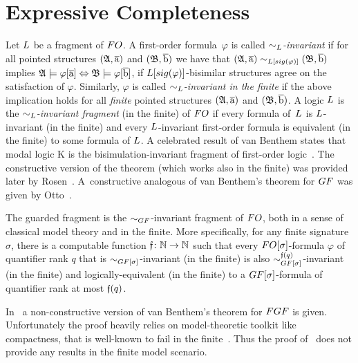 
\section{Expressive Completeness}\label{sec:van-benthem-theorem}


Let $\logicL$ be a fragment of $\FO$. 
A first-order formula~$\varphi$ is called \emph{$\bisimto_{\logicL}$-invariant}
if for all pointed structures $({\mathfrak{A}},\overline{\mathrm{a}})$ and $({\mathfrak{B}}, \overline{\mathrm{b}})$ we have that  
$(\str{A},\elemtuplea) \bisimto_{\logicL[\sig(\varphi)]} (\str{B}, \elemtupleb)$ implies
${\mathfrak{A}} \models \varphi[\overline{\mathrm{a}}] \Leftrightarrow {\mathfrak{B}} \models \varphi[\overline{\mathrm{b}}]$, \ie if $\logicL[\sig(\varphi)]$-bisimilar structures agree on the satisfaction of $\varphi$.
Similarly, $\varphi$ is called \emph{$\bisimto_{\logicL}$-invariant in the finite} if the above implication holds for all \emph{finite} pointed structures $({\mathfrak{A}},\overline{\mathrm{a}})$ and $({\mathfrak{B}}, \overline{\mathrm{b}})$.
A logic $\logicL$ is the \emph{$\bisimto_{\logicL}$-invariant fragment} (in the finite) of $\FO$ if every formula of~$\logicL$ is $\logicL$-invariant (in the finite) and every $\logicL$-invariant first-order formula is equivalent (in the finite) to some formula of $\logicL$.
A celebrated result of van Benthem states that modal logic $\mathrm{K}$ is the bisimulation-invariant fragment of first-order logic~\cite[Thm.~2.2.1]{AndrekaNB98}. The constructive version of the theorem (which works also in the finite) was provided later by Rosen~\cite[Prop.~4]{Rosen97}.
A~constructive analogous of van Benthem's theorem for $\GF$ was given by Otto~\cite[Thm.~4.7]{Otto2012}.
\begin{theorem}\label{thm:vanBenthem-for-GF}
  The guarded fragment is the $\bisimto_{\GF}$-invariant fragment of $\FO$, both in a sense of classical model theory and in the finite.
  More specifically, for any finite signature $\sigma$, there is a computable function $\mathfrak{f} \colon {\mathbb{N}} \to {\mathbb{N}}$ such that every $\FO[\sigma]$-formula $\varphi$ of quantifier rank $q$ that is $\bisimto_{\GF[\sigma]}$-invariant (in the finite) is also $\bisimto^{\homof(q)}_{\GF[\sigma]}$-invariant (in the finite) and logically-equivalent (in the finite) to a $\GF[\sigma]$-formula of quantifier rank at most $\mathfrak{f}(q)$.
\end{theorem}
In~\cite[Thm. 5]{BednarczykJ22} a non-constructive version of van Benthem's theorem for $\FGF$ is given. 
Unfortunately the proof heavily relies on model-theoretic toolkit like compactness, that is well-known to fail in the finite~\cite[Prop.~3.2]{Libkin04}. Thus the proof of~\cite[Thm.~5]{BednarczykJ22} does not provide any results in the finite model scenario.
